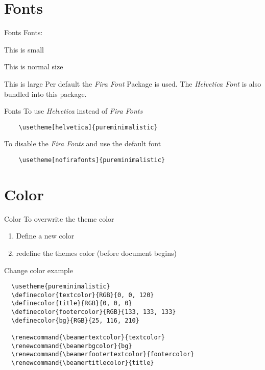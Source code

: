 \documentclass[aspectratio=169]{beamer}
\begin{document}
\section{Fonts}
\begin{frame}[fragile]{Fonts}
  Fonts:

  {\small This is small}

  This is normal size

    {\large This is large}
  \vfill
  Per default the \emph{Fira Font} Package is
  used. The \emph{Helvetica Font} is also bundled into this
  package.
\end{frame}

\begin{frame}[fragile]{Fonts}
  To use \emph{Helvetica} instead of \emph{Fira Fonts}
  \begin{verbatim}
    \usetheme[helvetica]{pureminimalistic}
  \end{verbatim}
  \vfill
  To disable the \emph{Fira Fonts} and use the default font
  \begin{verbatim}
    \usetheme[nofirafonts]{pureminimalistic}
  \end{verbatim}
\end{frame}

\section{Color}
\begin{frame}[fragile]{Color}
  To overwrite the theme color
  \begin{enumerate}
    \item Define a new color
    \item redefine the themes color (before document begins)
  \end{enumerate}
\end{frame}

\begin{frame}[fragile]{Change color example}
  \small
  \begin{verbatim}
  \usetheme{pureminimalistic}
  \definecolor{textcolor}{RGB}{0, 0, 120}
  \definecolor{title}{RGB}{0, 0, 0}
  \definecolor{footercolor}{RGB}{133, 133, 133}
  \definecolor{bg}{RGB}{25, 116, 210}

  \renewcommand{\beamertextcolor}{textcolor}
  \renewcommand{\beamerbgcolor}{bg}
  \renewcommand{\beamerfootertextcolor}{footercolor}
  \renewcommand{\beamertitlecolor}{title}
  \end{verbatim}
\end{frame}
\end{document}
